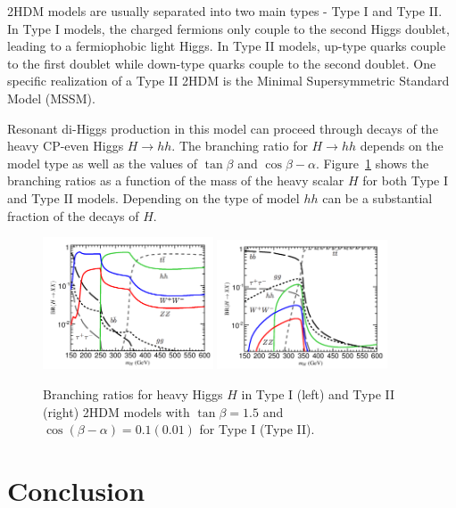 2HDM models are usually separated into two main types - Type I and Type II. In Type I models, the charged fermions only couple to the second Higgs doublet, leading to a fermiophobic light Higgs. In Type II models, up-type quarks couple to the first doublet while down-type quarks couple to the second doublet. One specific realization of a Type II 2HDM is the Minimal Supersymmetric Standard Model (MSSM).

Resonant di-Higgs production in this model can proceed through decays of the heavy CP-even Higgs $H\to hh$. The branching ratio for $H\to hh$ depends on the model type as well as the values of $\tan{\beta}$ and $\cos{\beta - \alpha}$. Figure~\ref{fig:H_BR} shows the branching ratios as a function of the mass of the heavy scalar $H$ for both Type I and Type II models. Depending on the type of model $hh$ can be a substantial fraction of the decays of $H$. 

\begin{figure}[h!]
  \centering
  \captionsetup{justification=centering}

  \includegraphics[width=0.45\textwidth]{figures/H_BR_type1}
  \includegraphics[width=0.45\textwidth]{figures/H_BR_type2}
   \caption{Branching ratios for heavy Higgs $H$ in Type I (left) and Type II (right) 2HDM models with $\tan{\beta} = 1.5$ and $\cos(\beta - \alpha) = 0.1 (0.01)$ for Type I (Type II). ~\cite{2HDM3}}
  \label{fig:H_BR}
\end{figure}

\section{Conclusion}

